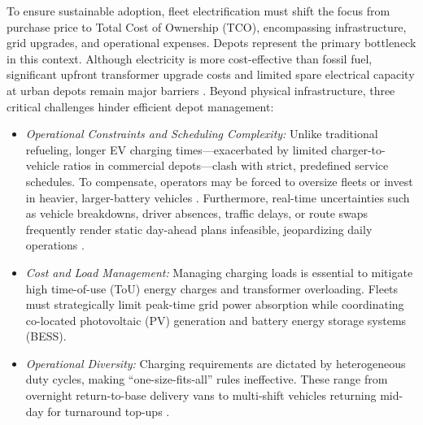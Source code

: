 \documentclass[final,3p,times,twocolumn]{elsarticle}
\begin{document}
To ensure sustainable adoption, fleet electrification must shift the focus from purchase price to Total Cost of Ownership (TCO), encompassing infrastructure, grid upgrades, and operational expenses. Depots represent the primary bottleneck in this context. Although electricity is more cost-effective than fossil fuel, significant upfront transformer upgrade costs and limited spare electrical capacity at urban depots remain major barriers \cite{motlagh2026review}. Beyond physical infrastructure, three critical challenges hinder efficient depot management:
\begin{itemize}
    \item \textit{Operational Constraints and Scheduling Complexity:} Unlike traditional refueling, longer EV charging times---exacerbated by limited charger-to-vehicle ratios in commercial depots---clash with strict, predefined service schedules. To compensate, operators may be forced to oversize fleets or invest in heavier, larger-battery vehicles \cite{keshavarzian2024optimal,vales2026emergent}. Furthermore, real-time uncertainties such as vehicle breakdowns, driver absences, traffic delays, or route swaps frequently render static day-ahead plans infeasible, jeopardizing daily operations \cite{alhanahi2024charging,jack2025estimating,zhao2023toward}.
    \item \textit{Cost and Load Management:} Managing charging loads is essential to mitigate high time-of-use (ToU) energy charges and transformer overloading. Fleets must strategically limit peak-time grid power absorption while coordinating co-located photovoltaic (PV) generation and battery energy storage systems (BESS).
    \item \textit{Operational Diversity:} Charging requirements are dictated by heterogeneous duty cycles, making ``one-size-fits-all'' rules ineffective. These range from overnight return-to-base delivery vans to multi-shift vehicles returning mid-day for turnaround top-ups \cite{vales2026emergent,fiori2018modelling}.
\end{itemize}
\end{document}
